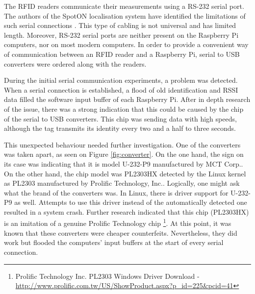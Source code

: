 The RFID readers communicate their measurements using a RS-232 serial port. The authors of the SpotON localisation system have identified the limitations of such serial connections \cite[p. 6]{Hightower2000}. This type of cabling is not universal and has limited length. Moreover, RS-232 serial ports are neither present on the Raspberry Pi computers, nor on most modern computers. In order to provide a convenient way of communication between an RFID reader and a Raspberry Pi, serial to USB converters were ordered along with the readers.

During the initial serial communication experiments, a problem was detected. When a serial connection is established, a flood of old identification and RSSI data filled the software input buffer of each Raspberry Pi. After in depth research of the issue, there was a strong indication that this could be caused by the chip of the serial to USB converters. This chip was sending data with high speeds, although the tag transmits its identity every two and a half to three seconds. 

This unexpected behaviour needed further investigation. One of the converters was taken apart, as seen on Figure \ref{fig:converter}. On the one hand, the sign on its case was indicating that it is model U-232-P9 manufactured by MCT Corp.. On the other hand, the chip model was PL2303HX detected by the Linux kernel as PL2303 manufactured by Prolific Technology, Inc.. Logically, one might ask what the brand of the converters was. In Linux, there is driver support for U-232-P9 as well. Attempts to use this driver instead of the automatically detected one resulted in a system crash. Further research indicated that this chip (PL2303HX) is an imitation of a genuine Prolific Technology chip \footnote{Prolific Technology Inc. PL2303 Windows Driver Download - \url{http://www.prolific.com.tw/US/ShowProduct.aspx?p_id=225&pcid=41}}. At this point, it was known that these converters were cheaper counterfeits. Nevertheless, they did work but flooded the computers' input buffers at the start of every serial connection.

